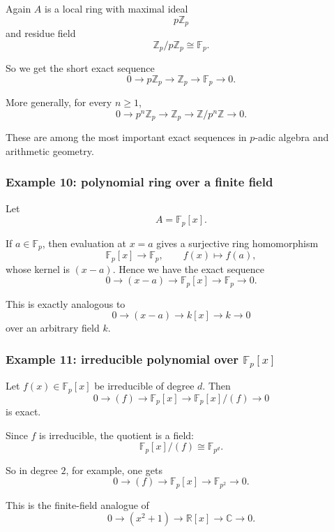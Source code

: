 \documentclass[12pt,a4paper]{article}
\theoremstyle{notespace}
\theoremstyle{definition}
\begin{document}
Again \(A\) is a local ring with maximal ideal
\[
p\mathbb Z_p
\]
and residue field
\[
\mathbb Z_p/p\mathbb Z_p \cong \mathbb F_p.
\]

So we get the short exact sequence
\[
0 \longrightarrow p\mathbb Z_p
\longrightarrow
\mathbb Z_p
\longrightarrow
\mathbb F_p
\longrightarrow 0.
\]

More generally, for every \(n\geq 1\),
\[
0 \longrightarrow p^n\mathbb Z_p
\longrightarrow
\mathbb Z_p
\longrightarrow
\mathbb Z/p^n\mathbb Z
\longrightarrow 0.
\]

These are among the most important exact sequences in \(p\)-adic algebra and arithmetic geometry.

\subsubsection{Example 10: polynomial ring over a finite field}

Let
\[
A=\mathbb F_p[x].
\]

If \(a\in \mathbb F_p\), then evaluation at \(x=a\) gives a surjective ring homomorphism
\[
\mathbb F_p[x] \longrightarrow \mathbb F_p,
\qquad
f(x)\longmapsto f(a),
\]
whose kernel is \((x-a)\). Hence we have the exact sequence
\[
0 \longrightarrow (x-a)
\longrightarrow
\mathbb F_p[x]
\longrightarrow
\mathbb F_p
\longrightarrow 0.
\]

This is exactly analogous to
\[
0 \longrightarrow (x-a) \longrightarrow k[x] \longrightarrow k \longrightarrow 0
\]
over an arbitrary field \(k\).

\subsubsection{Example 11: irreducible polynomial over \(\mathbb F_p[x]\)}

Let \(f(x)\in \mathbb F_p[x]\) be irreducible of degree \(d\). Then
\[
0 \longrightarrow (f)
\longrightarrow
\mathbb F_p[x]
\longrightarrow
\mathbb F_p[x]/(f)
\longrightarrow 0
\]
is exact.

Since \(f\) is irreducible, the quotient is a field:
\[
\mathbb F_p[x]/(f)\cong \mathbb F_{p^d}.
\]

So in degree \(2\), for example, one gets
\[
0 \longrightarrow (f)
\longrightarrow
\mathbb F_p[x]
\longrightarrow
\mathbb F_{p^2}
\longrightarrow 0.
\]

This is the finite-field analogue of
\[
0 \longrightarrow (x^2+1)
\longrightarrow
\mathbb R[x]
\longrightarrow
\mathbb C
\longrightarrow 0.
\]
\end{document}

